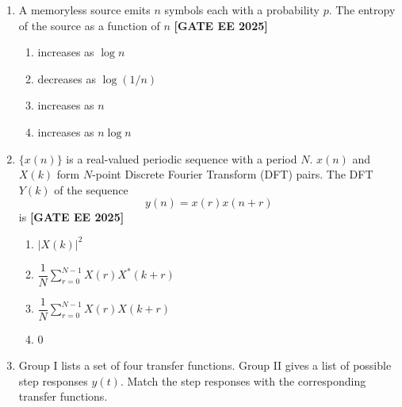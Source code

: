 \documentclass[12pt,a4paper]{article}
\begin{document}
\begin{enumerate}[leftmargin=*, label=\textbf{Q.\arabic*:}]
\item A memoryless source emits $n$ symbols each with a probability $p$. The entropy of the source as a function of $n$
\newline
\noindent \textbf{[GATE EE 2025]}
\begin{enumerate}[label=(\Alph*)]
  \item increases as $\log n$
  \item decreases as $\log(1/n)$
  \item increases as $n$
  \item increases as $n \log n$
\end{enumerate}

\item $\{x(n)\}$ is a real-valued periodic sequence with a period $N$. $x(n)$ and $X(k)$ form $N$-point Discrete Fourier Transform (DFT) pairs. The DFT $Y(k)$ of the sequence
\[
y(n) = x(r) x(n + r)
\]
is
\newline
\noindent \textbf{[GATE EE 2025]}
\begin{enumerate}[label=(\Alph*)]
  \item $|X(k)|^2 $
  \item $\dfrac{1}{N} \sum_{r=0}^{N-1} X(r) X^*(k+r) $
  \item $\dfrac{1}{N} \sum_{r=0}^{N-1} X(r) X(k+r) $
  \item $0$
\end{enumerate}

\item
Group I lists a set of four transfer functions. Group II gives a list of possible step responses $y(t)$. Match the step responses with the corresponding transfer functions.


\end{enumerate}
\end{document}
